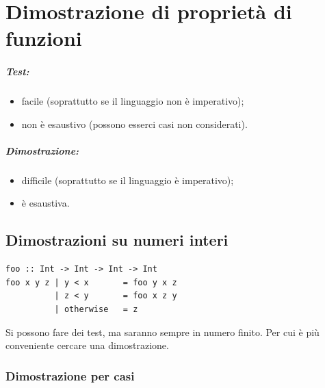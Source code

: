 \chapter{Dimostrazione di proprietà di funzioni}



\paragraph{Test:}

\begin{itemize}
    \item facile (soprattutto se il linguaggio non è imperativo);
    \item non è esaustivo (possono esserci casi non considerati).
\end{itemize}

\paragraph{Dimostrazione:}

\begin{itemize}
    \item difficile (soprattutto se il linguaggio è imperativo);
    \item è esaustiva.
\end{itemize}

\section{Dimostrazioni su numeri interi}

\begin{lstlisting}
foo :: Int -> Int -> Int -> Int
foo x y z | y < x       = foo y x z
          | z < y       = foo x z y
          | otherwise   = z
\end{lstlisting}


Si possono fare dei test, ma saranno sempre in numero finito. Per cui è più conveniente cercare una dimostrazione.

\subsection{Dimostrazione per casi}

